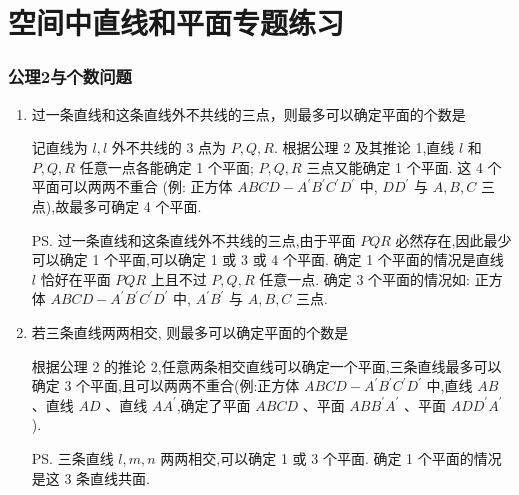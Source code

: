 \chapter*{空间中直线和平面专题练习}
\subsection*{公理2与个数问题}
\begin{enumerate}
    \item 过一条直线和这条直线外不共线的三点，则最多可以确定平面的个数是 
    \begin{jieda}
        记直线为 $l,l$ 外不共线的 3 点为 $P,Q,R$. 根据公理 2 及其推论 1,直线 $l$ 和 $P,Q,R$ 任意一点各能确定 1 个平面; $P,Q,R$ 三点又能确定 1 个平面. 这 4 个平面可以两两不重合 (例: 正方体 ${ABCD} - {A}^{\prime }{B}^{\prime }{C}^{\prime }{D}^{\prime }$ 中, $D{D}^{\prime }$ 与 $A,B,C$ 三点),故最多可确定 4 个平面. 
        
        \ps 过一条直线和这条直线外不共线的三点,由于平面 ${PQR}$ 必然存在,因此最少可以确定 1 个平面,可以确定 1 或 3 或 4 个平面. 确定 1 个平面的情况是直线 $l$ 恰好在平面 ${PQR}$ 上且不过 $P,Q,R$ 任意一点. 确定 3 个平面的情况如: 正方体 ${ABCD} - {A}^{\prime }{B}^{\prime }{C}^{\prime }{D}^{\prime }$ 中, ${A}^{\prime }{B}^{\prime }$ 与 $A,B,C$ 三点.
    \end{jieda}
    \item 若三条直线两两相交, 则最多可以确定平面的个数是 
    \begin{jieda}
        根据公理 2 的推论 2,任意两条相交直线可以确定一个平面,三条直线最多可以确定 3 个平面,且可以两两不重合(例:正方体 ${ABCD} - {A}^{\prime }{B}^{\prime }{C}^{\prime }{D}^{\prime }$ 中,直线 ${AB}$ 、直线 ${AD}$ 、直线 $A{A}^{\prime }$,确定了平面 ${ABCD}$ 、平面 ${AB}{B}^{\prime }{A}^{\prime }$ 、平面 ${AD}{D}^{\prime }{A}^{\prime }$ ). 
        
        \ps 三条直线 $l,m,n$ 两两相交,可以确定 1 或 3 个平面. 确定 1 个平面的情况是这 3 条直线共面.
    \end{jieda}
    

\end{enumerate}
